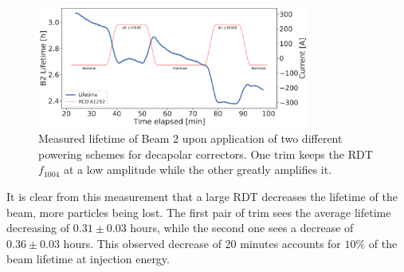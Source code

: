 \begin{figure}[!htb]
    \centering
    \includegraphics[width=0.8\textwidth]{./images/b5_lifetime.pdf}
    \caption{Measured lifetime of Beam 2 upon application of two different powering schemes for
    decapolar correctors. One trim keeps the RDT $f_{1004}$ at a low amplitude while the other greatly
    amplifies it.}
    \label{fig:decapoles:impact:b5_lifetime}
\end{figure}

It is clear from this measurement that a large RDT decreases the lifetime of the beam, more
particles being lost.
The first pair of trim sees the average lifetime decreasing of $0.31 \pm 0.03$ hours, while the
second one sees a decrease of $0.36 \pm 0.03$ hours. This observed decrease of 20 minutes accounts
for $10\%$ of the beam lifetime at injection energy.

